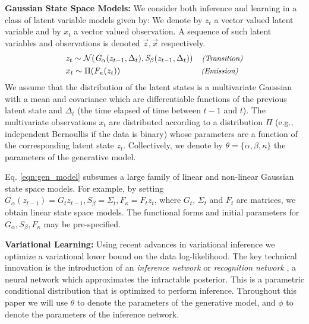 \documentclass[letterpaper]{article}
\newcommand{\mathtext}[1]{\small{\textit{(#1)}}}
\newcommand{\dt}{\Delta}
\newcommand{\meanfxn}{\textit{G}_{\alpha}}
\newcommand{\covfxn}{\textit{S}_{\beta}}
\newcommand{\emisfxn}{\textit{F}_{\kappa}}
\theoremstyle{plain}
\begin{document}
\textbf{Gaussian State Space Models:}
We consider both inference and learning in a class of latent variable models given by:
We denote by $z_t$ a vector valued latent variable and by $x_t$ a vector valued observation. 
A sequence of such latent variables and observations is denoted $\vec{z},\vec{x}$ respectively.
\begin{align}
	\label{eqn:gen_model}
	&z_t \sim \mathcal{N} (\meanfxn(z_{t-1},\dt_t),\covfxn(z_{t-1},\dt_t)) &\mathtext{Transition}\\ 
	&x_t \sim \Pi(\emisfxn(z_t))\; &\mathtext{Emission} \;\;
\end{align}
We assume that the distribution of the latent states is a multivariate
Gaussian with a mean and covariance which are differentiable functions of the previous latent state and $\dt_t$ (the time elapsed
of time between $t-1$ and $t$). 
The multivariate observations $x_t$ are distributed according to a distribution $\Pi$ 
(e.g., independent Bernoullis if the data is binary) whose parameters are a function of the corresponding latent state $z_t$.
Collectively, we denote by $\theta=\{\alpha,\beta,\kappa\}$ the parameters of the generative model. 

Eq. \ref{eqn:gen_model} subsumes a large family of linear 
and non-linear Gaussian state space models. 
For example, by setting $\meanfxn(z_{t-1}) = G_t z_{t-1},\covfxn = \Sigma_t,\emisfxn=F_t z_{t}$, where $G_t$, $\Sigma_t$ and $F_t$ are matrices,
we obtain linear state space models. 
The functional forms
and initial parameters for $\meanfxn,\covfxn,\emisfxn$ may be pre-specified.

\textbf{Variational Learning: }
Using recent advances in variational inference 
we optimize a variational lower bound on the data log-likelihood. 
The key technical innovation is the introduction of an \emph{inference network} or \emph{recognition network} \cite{hinton1995wake,kingma2013auto,mnih2014neural,rezende2014stochastic}, a neural network which approximates the intractable posterior. This is a parametric conditional distribution that is optimized to perform inference. 
Throughout this paper we will use $\theta$ to denote the parameters of the generative model, and $\phi$ to denote the parameters of the inference network.
\end{document}
